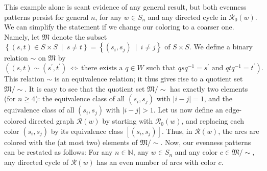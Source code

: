 \documentclass
[numbers=enddot,12pt,final,onecolumn,notitlepage,abstracton]{scrartcl}%
\theoremstyle{definition}
\begin{document}
This example alone is scant evidence of any general result, but both evenness
patterns persist for general $n$, for any $w\in S_{n}$ and any directed cycle
in $\mathcal{R}_{0}\left(  w\right)  $. We can simplify the statement if we
change our coloring to a coarser one. Namely, let $\mathfrak{M}$ denote the
subset $\left\{  \left(  s,t\right)  \in S\times S\ \mid\ s\neq t\right\}
=\left\{  \left(  s_{i},s_{j}\right)  \ \mid\ i\neq j\right\}  $ of $S\times
S$. We define a binary relation $\sim$ on $\mathfrak{M}$ by%
\[
\left(  \left(  s,t\right)  \sim\left(  s^{\prime},t^{\prime}\right)
\ \Longleftrightarrow\ \text{there exists a }q\in W\text{ such that }%
qsq^{-1}=s^{\prime}\text{ and }qtq^{-1}=t^{\prime}\right)  .
\]
This relation $\sim$ is an equivalence relation; it thus gives rise to a
quotient set $\mathfrak{M}/\sim$. It is easy to see that the quotient set
$\mathfrak{M}/\sim$ has exactly two elements (for $n\geq4$): the equivalence
class of all $\left(  s_{i},s_{j}\right)  $ with $\left\vert i-j\right\vert
=1$, and the equivalence class of all $\left(  s_{i},s_{j}\right)  $ with
$\left\vert i-j\right\vert >1$. Let us now define an edge-colored directed
graph $\mathcal{R}\left(  w\right)  $ by starting with $\mathcal{R}_{0}\left(
w\right)  $, and replacing each color $\left(  s_{i},s_{j}\right)  $ by its
equivalence class $\left[  \left(  s_{i},s_{j}\right)  \right]  $. Thus, in
$\mathcal{R}\left(  w\right)  $, the arcs are colored with the (at most two)
elements of $\mathfrak{M}/\sim$. Now, our evenness patterns can be restated as
follows: For any $n\in\mathbb{N}$, any $w\in S_{n}$ and any color
$c\in\mathfrak{M}/\sim$, any directed cycle of $\mathcal{R}\left(  w\right)  $
has an even number of arcs with color $c$.
\end{document}

